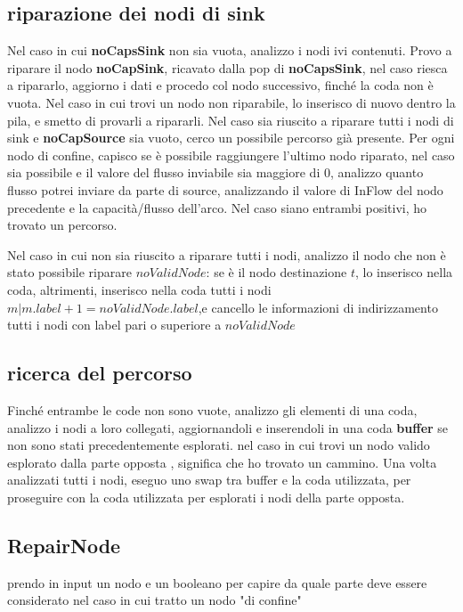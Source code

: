 \documentclass{article}
\begin{document}
\subsection{riparazione dei nodi di sink}
Nel caso in cui \textbf{noCapsSink} non sia vuota, analizzo i nodi ivi contenuti.
Provo a riparare il nodo \textbf{noCapSink}, ricavato dalla pop di \textbf{noCapsSink},
nel caso riesca a ripararlo, aggiorno i dati e procedo col nodo successivo, finché la coda non è vuota.
Nel caso in cui trovi un nodo non riparabile, lo inserisco di nuovo dentro la pila, e smetto di provarli a ripararli.
Nel caso sia riuscito a riparare tutti i nodi di sink e \textbf{noCapSource} sia vuoto, cerco un possibile percorso già presente.
Per ogni nodo di confine, capisco se è possibile raggiungere l'ultimo nodo riparato, nel caso sia possibile
e il valore del flusso inviabile sia maggiore di 0,
analizzo quanto flusso potrei inviare da parte di source,
analizzando il valore di InFlow del nodo precedente e
la capacità/flusso dell'arco.
Nel caso siano entrambi positivi, ho trovato un percorso.

Nel caso in cui non sia riuscito a riparare tutti i nodi, analizzo il nodo che non è stato possibile riparare $noValidNode$:
se è il nodo destinazione $t$, lo inserisco nella coda, altrimenti, inserisco nella coda tutti i nodi $m | m.label +1 = noValidNode.label$,e cancello le informazioni di indirizzamento tutti i nodi con label pari o superiore a $noValidNode$

\subsection{ricerca del percorso}
Finché entrambe le code non sono vuote, analizzo gli elementi di una coda,
analizzo i nodi a loro collegati, aggiornandoli e inserendoli in una coda \textbf{buffer} se non sono stati precedentemente esplorati.
nel caso in cui trovi un nodo valido esplorato dalla parte opposta , significa che ho trovato un cammino.
Una volta analizzati tutti i nodi, eseguo uno swap tra buffer e la coda utilizzata, per proseguire con la coda
utilizzata per esplorati i nodi della parte opposta.

\subsection{RepairNode}

prendo in input un nodo e un booleano per capire da quale parte deve essere considerato nel caso in cui tratto un nodo "di confine"
\end{document}
